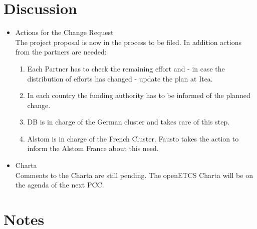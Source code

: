 \documentclass[a4paper, 11pt]{article}
\begin{document}
\section{Discussion}
\begin{itemize}

\item Actions for the Change Request\\
The project proposal is now in the process to be filed. In addition actions from the partners are needed:
\begin{enumerate}
\item Each Partner has to check the remaining effort and - in case the distribution of efforts has changed - update the plan at Itea.
\item In each country the funding authority has to be informed of the planned change.
\item DB is in charge of the German cluster and takes care of this step.
\item Alstom is in charge of the French Cluster. Fausto takes the action to inform the Alstom France about this need. 
\end{enumerate}

\item Charta\\
Comments to the Charta are still pending. The openETCS Charta will be on the agenda of the next PCC.

\end{itemize}

\section{Notes}
\end{document}
